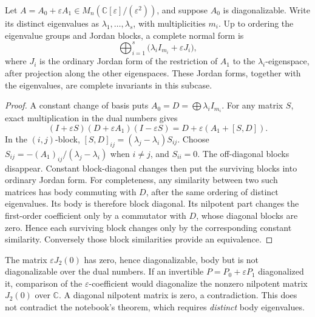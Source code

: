 \begin{proposition}
Let \(A=A_0+\varepsilon A_1\in M_n(\mathbb C[\varepsilon]/(\varepsilon^2))\), and suppose \(A_0\) is diagonalizable. Write its distinct eigenvalues as \(\lambda_1,\ldots,\lambda_s\), with multiplicities \(m_i\). Up to ordering the eigenvalue groups and Jordan blocks, a complete normal form is
\[
 \bigoplus_{i=1}^s\bigl(\lambda_i I_{m_i}+\varepsilon J_i\bigr),
\]
where \(J_i\) is the ordinary Jordan form of the restriction of \(A_1\) to the \(\lambda_i\)-eigenspace, after projection along the other eigenspaces. These Jordan forms, together with the eigenvalues, are complete invariants in this subcase.
\end{proposition}
\begin{proof}
A constant change of basis puts \(A_0=D=\bigoplus\lambda_iI_{m_i}\). For any matrix \(S\), exact multiplication in the dual numbers gives
\[
 (I+\varepsilon S)(D+\varepsilon A_1)(I-\varepsilon S)
 =D+\varepsilon(A_1+[S,D]).
\]
In the \((i,j)\)-block, \([S,D]_{ij}=(\lambda_j-\lambda_i)S_{ij}\). Choose \(S_{ij}=-(A_1)_{ij}/(\lambda_j-\lambda_i)\) when \(i\ne j\), and \(S_{ii}=0\). The off-diagonal blocks disappear. Constant block-diagonal changes then put the surviving blocks into ordinary Jordan form. For completeness, any similarity between two such matrices has body commuting with \(D\), after the same ordering of distinct eigenvalues. Its body is therefore block diagonal. Its nilpotent part changes the first-order coefficient only by a commutator with \(D\), whose diagonal blocks are zero. Hence each surviving block changes only by the corresponding constant similarity. Conversely those block similarities provide an equivalence.
\end{proof}

\begin{example}
The matrix \(\varepsilon J_2(0)\) has zero, hence diagonalizable, body but is not diagonalizable over the dual numbers. If an invertible \(P=P_0+\varepsilon P_1\) diagonalized it, comparison of the \(\varepsilon\)-coefficient would diagonalize the nonzero nilpotent matrix \(J_2(0)\) over \(\mathbb C\). A diagonal nilpotent matrix is zero, a contradiction. This does not contradict the notebook's theorem, which requires \emph{distinct} body eigenvalues.
\end{example}

